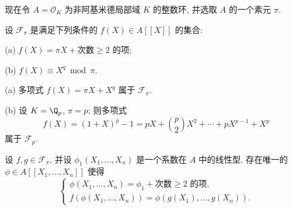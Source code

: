 现在令 $A=\mathcal{O}_K$ 为非阿基米德局部域 $K$ 的整数环, 并选取 $A$ 的一个素元 $\pi$.

\begin{definition}\label{def:2.9}
设 $\mathcal{F}_{\pi}$ 是满足下列条件的 $f(X)\in A[[X]]$ 的集合:

(a) $f(X)=\pi X+\text{次数}\ge 2\text{ 的项}$;

(b) $f(X)\equiv X^q\bmod\pi$.
\end{definition}

\begin{example}\label{ex:2.10}
(a) 多项式 $f(X)=\pi X+X^q$ 属于 $\mathcal{F}_{\pi}$.

(b) 设 $K=\Q_p$, $\pi=p$; 则多项式
\[
f(X)=(1+X)^p-1=pX+\binom{p}{2}X^2+\cdots+pX^{p-1}+X^p
\]
属于 $\mathcal{F}_p$.
\end{example}

\begin{lemma}\label{lem:2.11}
设 $f,g\in\mathcal{F}_{\pi}$, 并设 $\phi_1(X_1,\ldots,X_n)$ 是一个系数在 $A$ 中的线性型. 存在唯一的 $\phi\in A[[X_1,\ldots,X_n]]$ 使得
\[
\begin{cases}
\phi(X_1,\ldots,X_n)=\phi_1+\text{次数}\ge 2\text{ 的项},\\
f(\phi(X_1,\ldots,X_n))=\phi(g(X_1),\ldots,g(X_n)).
\end{cases}
\]
\end{lemma}

